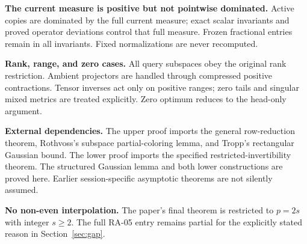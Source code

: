 \documentclass[11pt]{article}
\theoremstyle{remark}\newtheorem{remark}[theorem]{Remark}
\begin{document}
\textbf{The current measure is positive but not pointwise dominated.} Active copies are dominated by the full current measure; exact scalar invariants and proved operator deviations control that full measure. Frozen fractional entries remain in all invariants. Fixed normalizations are never recomputed.

\textbf{Rank, range, and zero cases.} All query subspaces obey the original rank restriction. Ambient projectors are handled through compressed positive contractions. Tensor inverses act only on positive ranges; zero tails and singular mixed metrics are treated explicitly. Zero optimum reduces to the head-only argument.

\textbf{External dependencies.} The upper proof imports the general row-reduction theorem, Rothvoss's subspace partial-coloring lemma, and Tropp's rectangular Gaussian bound. The lower proof imports the specified restricted-invertibility theorem. The structured Gaussian lemma and both lower constructions are proved here. Earlier session-specific asymptotic theorems are not silently assumed.

\textbf{No non-even interpolation.} The paper's final theorem is restricted to $p=2s$ with integer $s\ge2$. The full RA-05 entry remains partial for the explicitly stated reason in Section~\ref{sec:gap}.
\end{document}
